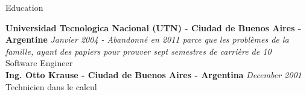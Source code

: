 \documentclass{resume} %
\begin{document}
\begin{rSection}{Education}


{\bf Universidad Tecnologica Nacional (UTN) - Ciudad de Buenos Aires - Argentine} \hfill {\em Janvier 2004 - Abandonn\'{e} en 2011 parce que les probl\`{e}mes de la famille, ayant des papiers pour prouver sept semestres de carri\`{e}re de 10} \\ 
Software Engineer  \\

{\bf Ing. Otto Krause - Ciudad de Buenos Aires - Argentina} \hfill {\em December 2001} \\ 
Technicien dans le calcul \\
\end{rSection}





\end{document}

